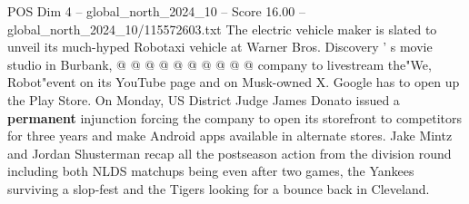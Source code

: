 \begin{textsample}{POS Dim 4 – global\_north\_2024\_10 – Score 16.00 – global\_north\_2024\_10/115572603.txt}
The electric vehicle maker is slated to unveil its much-hyped Robotaxi vehicle at Warner Bros.
Discovery ' s movie studio in Burbank, @ @ @ @ @ @ @ @ @ @ company to livestream the"We, Robot"event on its YouTube page and on Musk-owned X.
Google has to open up the Play Store.
On Monday, US District Judge James Donato issued a \textbf{permanent} injunction forcing the company to open its storefront to competitors for three years and make Android apps available in alternate stores.
Jake Mintz and Jordan Shusterman recap all the postseason action from the division round including both NLDS matchups being even after two games, the Yankees surviving a slop-fest and the Tigers looking for a bounce back in Cleveland.

\end{textsample}
